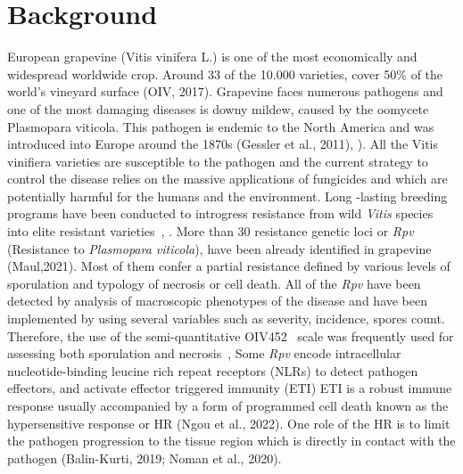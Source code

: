 \documentclass[english]{article}
\begin{document}

\begin{abstract}

\end{abstract}

\section{Background}
European grapevine (Vitis vinifera L.) is one of the most economically and widespread worldwide crop. Around 33 of the  10.000 varieties,  cover 50\% of the world's vineyard surface (OIV, 2017).
Grapevine faces numerous pathogens and one of the most damaging diseases is downy mildew, caused by the oomycete Plasmopara viticola. This pathogen is endemic to the North America and was introduced into Europe around the 1870s  (Gessler et al., 2011), \parencite{fontaineEuropeBridgeheadWorldwide2021}). All the Vitis vinifiera varieties are susceptible to the pathogen and the current strategy to control the disease  relies on the massive applications of fungicides and which are potentially harmful for the humans and the environment. Long -lasting breeding programs have been conducted to introgress resistance from wild \textit{Vitis} species into elite resistant varieties~\parencite{merdinogluBreedingDurableResistance2018}, \parencite{topferCoolClimatePerspective2022}. More than 30 resistance genetic loci or \textit{Rpv} (Resistance to \textit{Plasmopara viticola}), have been already identified in grapevine (Maul,2021).  Most of them confer a partial resistance defined by various levels of sporulation and typology of necrosis or cell death. All of the \textit{Rpv} have been detected by analysis of macroscopic phenotypes of the disease and have been implemented by using several variables such as severity, incidence, spores count. Therefore, the use of the semi-quantitative OIV452~\parencite{OIVDescriptorList2009} scale was frequently used for assessing both sporulation and necrosis~\parencite{possamaiPhenotypingQTLIdentification2022},  Some \textit{Rpv} encode  intracellular nucleotide-binding leucine rich repeat receptors (NLRs) to detect pathogen effectors,  and activate effector triggered immunity (ETI) ETI is a robust immune response usually
accompanied by a form of programmed cell death known as the hypersensitive response or HR (Ngou et al., 2022).  One role of the HR is to limit the pathogen progression to the tissue region which is directly in contact with the pathogen (Balin-Kurti, 2019; Noman et al., 2020).  
\end{document}
